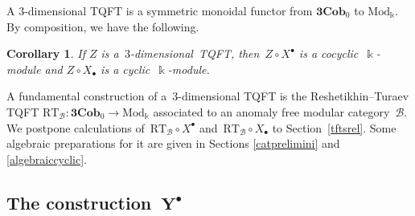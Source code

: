 \documentclass[pdftex]{sigma}
\numberwithin{equation}{section}
\newtheorem{Corollary}[Theorem]{Corollary}
\newcommand{\co}{\colon}
\newcommand{\mc}{\mathcal}
\newcommand{\Mod}{\mathrm{Mod}}
\newcommand{\Cob}{\textbf{Cob}}
\newcommand{\kk}{\Bbbk}
\newcommand{\RT}{\text{RT}}
\begin{document}
A $3$-dimensional TQFT is a symmetric monoidal functor from $\textbf{3}\Cob_0$ to $\Mod_\kk$. By composition, we have the following.

\begin{Corollary} If $Z$ is a~$3$-dimensional~{TQFT}, then~$Z\circ X^\bullet$ is a cocyclic~$\kk$-module and $Z\circ X_\bullet$ is a cyclic~$\kk$-module.
\end{Corollary}
A fundamental construction of a~$3$-dimensional TQFT is the Reshetikhin--Turaev TQFT $\RT_{\mc B} \co \textbf{3}\Cob_0 \to \Mod_\kk$ associated to an anomaly free modular category~$\mc B$.
We postpone calculations of~$\RT_{\mc B}\circ X^\bullet$ and~$\RT_{\mc B}\circ X_\bullet$ to Section~\ref{tftsrel}.
Some algebraic preparations for it are given in Sections \ref{catprelimini} and \ref{algebraiccyclic}.

\subsection[The construction Y\^{}\{bullet\}]{The construction~$\boldsymbol{Y^\bullet}$}\label{construction}
\end{document}
